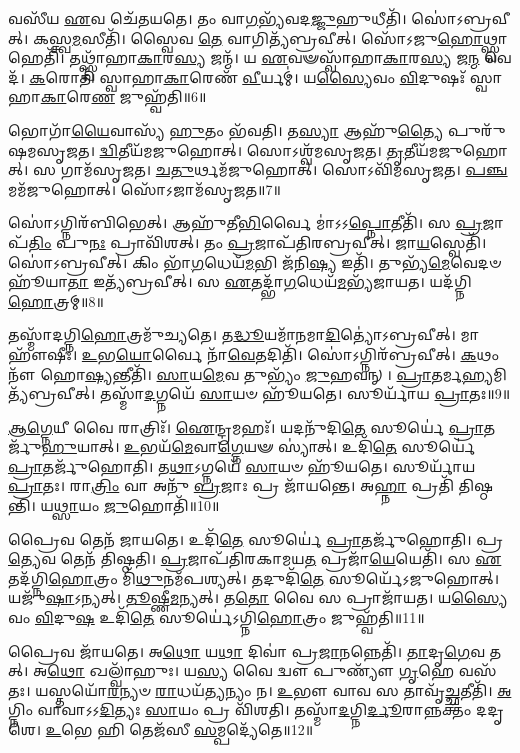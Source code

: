 𑌵𑌸𑍀᳴𑌯 \ul{𑌏}\-𑌵 𑌚𑍇᳴𑌤𑌯𑌤𑍇।
𑌤𑌂 𑌵𑌾\-\ul{𑌗}\-𑌭𑍍𑌯᳴𑌵𑌦\-\ul{𑌜𑍍𑌜𑍁}\-𑌹𑍁𑌧𑍀𑌤𑌿᳴।
𑌸𑍋॑𑌽𑌬𑍍𑌰𑌵𑍀𑌤𑍍।
𑌕𑌸𑍍𑌤𑍍𑌵\-\ul{𑌮}\-𑌸𑍀𑌤𑌿᳴।
𑌸𑍍𑌵𑍈𑌵 \ul{𑌤𑍇} 𑌵𑌾𑌗𑌿𑌤𑍍𑌯᳴𑌬𑍍𑌰𑌵𑍀𑌤𑍍।
𑌸𑍋᳴𑌽𑌜𑍁\-\ul{𑌹𑍋}\-𑌥𑍍𑌸𑍍𑌵𑌾𑌹𑍇𑌤𑌿᳴।
𑌤𑌥𑍍𑌸𑍍𑌵𑌾᳴𑌹𑌾\-\ul{𑌕𑌾}\-𑌰\-\ul{𑌸𑍍𑌯} 𑌜𑌨𑍍𑌮᳴।
𑌯 \ul{𑌏}\-𑌵𑍟𑌸𑍍𑌵𑌾᳴𑌹𑌾\-\ul{𑌕𑌾}\-𑌰\-\ul{𑌸𑍍𑌯} 𑌜\-\ul{𑌨𑍍𑌮} 𑌵𑍇𑌦᳴।
\-\ul{𑌕}\-𑌰𑍋𑌤𑌿᳴ 𑌸𑍍𑌵𑌾𑌹𑌾\-\ul{𑌕𑌾}\-𑌰𑍇𑌣᳴ \ul{𑌵𑍀}\-𑌰𑍍𑌯𑌮𑍍॑।
𑌯\-\ul{𑌸𑍍𑌯𑍈}\-𑌵𑌂 \ul{𑌵𑌿}\-𑌦𑍁𑌷𑌃᳴ 𑌸𑍍𑌵𑌾𑌹𑌾\-\ul{𑌕𑌾}\-𑌰𑍇\-\ul{𑌣} 𑌜𑍁𑌹𑍍𑌵᳴𑌤𑌿॥6॥

𑌭𑍋𑌗𑌾᳴\-\ul{𑌯𑍈}\-𑌵𑌾𑌸𑍍𑌯᳴ \ul{𑌹𑍁}\-𑌤𑌂 𑌭᳴𑌵𑌤𑌿।
𑌤\-\ul{𑌸𑍍𑌯𑌾} 𑌆𑌹𑍁᳴\-\ul{𑌤𑍍𑌯𑍈} 𑌪𑍁𑌰𑍁᳴𑌷𑌮\-𑌸𑍃𑌜𑌤।
\-\ul{𑌦𑍍𑌵𑌿}\-𑌤𑍀𑌯᳴𑌮𑌜𑍁𑌹𑍋𑌤𑍍।
𑌸𑍋𑌽𑌶𑍍𑌵᳴𑌮\-𑌸𑍃𑌜𑌤।
\-\ul{𑌤𑍃}\-𑌤𑍀𑌯᳴𑌮𑌜𑍁𑌹𑍋𑌤𑍍।
𑌸 𑌗𑌾𑌮᳴\-𑌸𑍃𑌜𑌤।
\-\ul{𑌚}\-\-\ul{𑌤𑍁}\-𑌰𑍍𑌥𑌮᳴𑌜𑍁𑌹𑍋𑌤𑍍।
𑌸𑍋𑌽𑌵𑌿᳴𑌮\-𑌸𑍃𑌜𑌤।
\-\ul{𑌪}\-\-\ul{𑌞𑍍𑌚}\-𑌮𑌮᳴𑌜𑍁𑌹𑍋𑌤𑍍।
𑌸𑍋᳴𑌽𑌜𑌾𑌮᳴\-𑌸𑍃𑌜𑌤॥7॥

𑌸𑍋॑𑌽𑌗𑍍𑌨𑌿𑌰᳴𑌬𑌿𑌭𑍇𑌤𑍍।
𑌆𑌹𑍁᳴𑌤𑍀\-\ul{𑌭𑌿}\-𑌰𑍍𑌵𑍈 𑌮𑌾॑\-𑌽𑌽\-\ul{𑌪𑍍𑌨𑍋}\-𑌤𑍀𑌤𑌿᳴।
𑌸 \ul{𑌪𑍍𑌰}\-𑌜𑌾𑌪᳴\-\ul{𑌤𑌿𑌂} 𑌪𑍁\-\ul{𑌨𑌃} 𑌪𑍍𑌰𑌾𑌵𑌿᳴𑌶𑌤𑍍।
𑌤𑌂 \ul{𑌪𑍍𑌰}\-𑌜𑌾𑌪᳴𑌤𑌿𑌰𑌬𑍍𑌰𑌵𑍀𑌤𑍍।
𑌜𑌾\-\ul{𑌯}\-𑌸𑍍𑌵𑍇𑌤𑌿᳴।
𑌸𑍋॑𑌽𑌬𑍍𑌰𑌵𑍀𑌤𑍍।
𑌕𑌿𑌂 𑌭𑌾᳴\-\ul{𑌗}\-𑌧𑍇𑌯᳴\-\ul{𑌮}\-𑌭𑌿 𑌜᳴𑌨𑌿\-\ul{𑌷𑍍𑌯} 𑌇𑌤𑌿᳴।
𑌤𑍁𑌭𑍍𑌯᳴\-\ul{𑌮𑍇}\-𑌵𑍇𑌦𑍞 𑌹𑍂᳴𑌯𑌾\-\ul{𑌤𑌾} 𑌇𑌤𑍍𑌯᳴𑌬𑍍𑌰𑌵𑍀𑌤𑍍।
𑌸 \ul{𑌏}\-𑌤𑌦𑍍𑌭𑌾᳴\-\ul{𑌗}\-𑌧𑍇𑌯᳴\-\ul{𑌮}\-𑌭𑍍𑌯᳴𑌜𑌾𑌯𑌤।
𑌯𑌦᳴𑌗𑍍𑌨𑌿\-\ul{𑌹𑍋}\-𑌤𑍍𑌰𑌮𑍍॥8॥

𑌤𑌸𑍍𑌮𑌾᳴𑌦𑌗𑍍𑌨𑌿\-\ul{𑌹𑍋}\-𑌤𑍍𑌰𑌮𑍁᳴𑌚𑍍𑌯𑌤𑍇।
𑌤\-\ul{𑌦𑍍𑌧𑍂}\-𑌯𑌮𑌾᳴𑌨𑌮𑌾\-\ul{𑌦𑌿}\-𑌤𑍍𑌯𑍋॑\-𑌽𑌬𑍍𑌰𑌵𑍀𑌤𑍍।
𑌮𑌾 𑌹𑍗᳴𑌷𑍀𑌃।
\-\ul{𑌉}\-𑌭\-\ul{𑌯𑍋}\-𑌰𑍍𑌵𑍈 𑌨𑌾᳴\-\ul{𑌵𑍇}\-𑌤𑌦𑌿𑌤𑌿᳴।
𑌸𑍋॑𑌽𑌗𑍍𑌨𑌿𑌰᳴𑌬𑍍𑌰𑌵𑍀𑌤𑍍।
\-\ul{𑌕}\-𑌥𑌂 𑌨𑍗᳴ 𑌹𑍋\-\ul{𑌷𑍍𑌯}\-𑌨𑍍𑌤𑍀𑌤𑌿᳴।
\-\ul{𑌸𑌾}\-𑌯\-\ul{𑌮𑍇}\-𑌵 𑌤𑍁𑌭𑍍𑌯𑌂᳴ \ul{𑌜𑍁}\-𑌹𑌵𑌨𑍍।
\-\ul{𑌪𑍍𑌰𑌾}\-𑌤𑌰𑍍𑌮\-\ul{𑌹𑍍𑌯}\-𑌮𑌿𑌤𑍍𑌯᳴𑌬𑍍𑌰𑌵𑍀𑌤𑍍।
𑌤𑌸𑍍𑌮𑌾᳴\-\ul{𑌦}\-𑌗𑍍𑌨𑌯𑍇᳴ \ul{𑌸𑌾}\-𑌯𑍞 𑌹𑍂᳴𑌯𑌤𑍇।
𑌸𑍂𑌰𑍍𑌯𑌾᳴𑌯 \ul{𑌪𑍍𑌰𑌾}\-𑌤𑌃॥9॥

\-\ul{𑌆}\-\-\ul{𑌗𑍍𑌨𑍇}\-𑌯𑍀 𑌵𑍈 𑌰𑌾𑌤𑍍𑌰𑌿𑌃᳴।
\-\ul{𑌐}\-𑌨𑍍𑌦𑍍𑌰𑌮𑌹𑌃᳴।
𑌯𑌦𑌨𑍁᳴𑌦𑌿\-\ul{𑌤𑍇} 𑌸𑍂𑌰𑍍𑌯𑍇॑ \ul{𑌪𑍍𑌰𑌾}\-𑌤𑌰𑍍𑌜𑍁᳴\-\ul{𑌹𑍁}\-𑌯𑌾𑌤𑍍।
\-\ul{𑌉}\-𑌭𑌯᳴\-\ul{𑌮𑍇}\-𑌵𑌾\-\ul{𑌗𑍍𑌨𑍇}\-𑌯𑍟 𑌸𑍍𑌯𑌾॑𑌤𑍍।
𑌉𑌦𑌿᳴\-\ul{𑌤𑍇} 𑌸𑍂𑌰𑍍𑌯𑍇॑ \ul{𑌪𑍍𑌰𑌾}\-𑌤𑌰𑍍𑌜𑍁᳴𑌹𑍋𑌤𑌿।
𑌤\-\ul{𑌥𑌾}\-𑌽𑌗𑍍𑌨𑌯𑍇᳴ \ul{𑌸𑌾}\-𑌯𑍞 𑌹𑍂᳴𑌯𑌤𑍇।
𑌸𑍂𑌰𑍍𑌯𑌾᳴𑌯 \ul{𑌪𑍍𑌰𑌾}\-𑌤𑌃।
𑌰𑌾\-\ul{𑌤𑍍𑌰𑌿𑌂} 𑌵𑌾 𑌅𑌨𑍁᳴ \ul{𑌪𑍍𑌰}\-𑌜𑌾𑌃 𑌪𑍍𑌰 𑌜𑌾᳴𑌯𑌨𑍍𑌤𑍇।
𑌅\-\ul{𑌹𑍍𑌨𑌾} 𑌪𑍍𑌰𑌤𑌿᳴ 𑌤𑌿𑌷𑍍𑌠𑌨𑍍𑌤𑌿।
𑌯\-\ul{𑌥𑍍𑌸𑌾}\-𑌯𑌂 \ul{𑌜𑍁}\-𑌹𑍋𑌤𑌿᳴॥10॥

𑌪𑍍𑌰𑍈𑌵 𑌤𑍇𑌨᳴ 𑌜𑌾𑌯𑌤𑍇।
𑌉𑌦𑌿᳴\-\ul{𑌤𑍇} 𑌸𑍂𑌰𑍍𑌯𑍇॑ \ul{𑌪𑍍𑌰𑌾}\-𑌤𑌰𑍍𑌜𑍁᳴𑌹𑍋𑌤𑌿।
𑌪𑍍𑌰\-\ul{𑌤𑍍𑌯𑍇}\-𑌵 𑌤𑍇𑌨᳴ 𑌤𑌿𑌷𑍍𑌠𑌤𑌿।
\-\ul{𑌪𑍍𑌰}\-𑌜𑌾𑌪᳴𑌤𑌿𑌰𑌕𑌾𑌮𑌯\-\ul{𑌤} 𑌪𑍍𑌰𑌜𑌾᳴\-\ul{𑌯𑍇}\-𑌯𑍇𑌤𑌿᳴।
𑌸 \ul{𑌏}\-𑌤𑌦᳴𑌗𑍍𑌨𑌿\-\ul{𑌹𑍋}\-𑌤𑍍𑌰𑌂 𑌮𑌿᳴\-\ul{𑌥𑍁}\-𑌨𑌮᳴𑌪𑌶𑍍𑌯𑌤𑍍।
𑌤𑌦𑍁𑌦𑌿᳴\-\ul{𑌤𑍇} 𑌸𑍂𑌰𑍍𑌯𑍇᳴\-𑌽𑌜𑍁𑌹𑍋𑌤𑍍।
𑌯𑌜𑍁᳴\-\ul{𑌷𑌾}\-\-𑌽𑌨𑍍𑌯𑌤𑍍।
\-\ul{𑌤𑍂}\-𑌷𑍍𑌣𑍀\-\ul{𑌮}\-𑌨𑍍𑌯𑌤𑍍।
𑌤\-\ul{𑌤𑍋} 𑌵𑍈 𑌸 𑌪𑍍𑌰𑌾𑌜𑌾᳴𑌯𑌤।
𑌯\-\ul{𑌸𑍍𑌯𑍈}\-𑌵𑌂 \ul{𑌵𑌿}\-𑌦𑍁\-\ul{𑌷} 𑌉𑌦𑌿᳴\-\ul{𑌤𑍇} 𑌸𑍂𑌰𑍍𑌯𑍇॑\-𑌽𑌗𑍍𑌨𑌿\-\ul{𑌹𑍋}\-𑌤𑍍𑌰𑌂 𑌜𑍁𑌹𑍍𑌵᳴𑌤𑌿॥11॥

𑌪𑍍𑌰𑍈𑌵 𑌜𑌾᳴𑌯𑌤𑍇।
𑌅\-\ul{𑌥𑍋} 𑌯\-\ul{𑌥𑌾} 𑌦𑌿𑌵𑌾॑ 𑌪𑍍𑌰\-\ul{𑌜𑌾}\-𑌨𑌨𑍍𑌨𑍇𑌤𑌿᳴।
\-\ul{𑌤𑌾}\-𑌦𑍃\-\ul{𑌗𑍇}\-𑌵 𑌤𑌤𑍍।
𑌅\-\ul{𑌥𑍋} 𑌖𑌲𑍍𑌵𑌾᳴𑌹𑍁𑌃।
𑌯\-\ul{𑌸𑍍𑌯} 𑌵𑍈 𑌦𑍍𑌵𑍗 𑌪𑍁𑌣𑍍𑌯𑍗᳴ \ul{𑌗𑍃}\-𑌹𑍇 𑌵𑌸᳴𑌤𑌃।
𑌯𑌸𑍍𑌤𑌯𑍋᳴\-\ul{𑌰}\-𑌨𑍍𑌯𑍞 \ul{𑌰𑌾}\-𑌧𑌯᳴\-\ul{𑌤𑍍𑌯}\-𑌨𑍍𑌯𑌂 𑌨।
\-\ul{𑌉}\-𑌭𑍗 𑌵𑌾𑌵 𑌸 𑌤𑌾𑌵𑍃᳴\-\ul{𑌚𑍍𑌛}\-𑌤𑍀𑌤𑌿᳴।
\-\ul{𑌅}\-𑌗𑍍𑌨𑌿𑌂 𑌵𑌾𑌵𑌾\-𑌽𑌽\-\ul{𑌦𑌿}\-𑌤𑍍𑌯𑌃 \ul{𑌸𑌾}\-𑌯𑌂 𑌪𑍍𑌰 𑌵𑌿᳴𑌶𑌤𑌿।
𑌤𑌸𑍍𑌮𑌾᳴\-\ul{𑌦}\-𑌗𑍍𑌨𑌿\-\ul{𑌰𑍍𑌦𑍂}\-𑌰𑌾𑌨𑍍𑌨𑌕𑍍𑌤𑌂᳴ 𑌦𑌦𑍃𑌶𑍇।
\-\ul{𑌉}\-𑌭𑍇 𑌹𑌿 𑌤𑍇𑌜᳴𑌸𑍀 \ul{𑌸}\-𑌮𑍍𑌪𑌦𑍍𑌯𑍇᳴𑌤𑍇॥12॥

